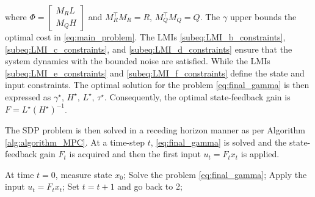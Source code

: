 where $\Phi = \begin{bmatrix} M_R L \\ M_Q H \end{bmatrix}$ and $M_R^\top M_R = R$, $M_Q^\top M_Q = Q$.
The $\gamma$ upper bounds the optimal cost in \autoref{eq:main_problem}.
The LMIs \eqref{subeq:LMI_b_constraints}, \eqref{subeq:LMI_c_constraints}, and \eqref{subeq:LMI_d_constraints} ensure that the system dynamics with the bounded noise are satisfied. While the LMIs \eqref{subeq:LMI_e_constraints} and \eqref{subeq:LMI_f_constraints} define the state and input constraints.
The optimal solution for the problem \eqref{eq:final_gamma} is then expressed as $\gamma^\star, \, H^\star, \, L^\star, \, \tau^\star$. Consequently, the optimal state-feedback gain is $F = L^\star (H^\star)^{-1}$.

The SDP problem is then solved in a receding horizon manner as per Algorithm \autoref{alg:algorithm_MPC}. At a time-step $t$, \eqref{eq:final_gamma} is solved and the state-feedback gain $F_t$ is acquired and then the first input $u_t = F_t x_t$ is applied.

\begin{algorithm}
	\caption{Data-driven min-max MPC}
	\begin{algorithmic}[1]
		\STATE At time $t = 0$, measure state $x_0$;
		\STATE Solve the problem \eqref{eq:final_gamma};
		\STATE Apply the input $u_t = F_t x_t$;
		\STATE Set $t = t + 1$ and go back to 2;
	\end{algorithmic}
	\label{alg:algorithm_MPC}
\end{algorithm}

%


